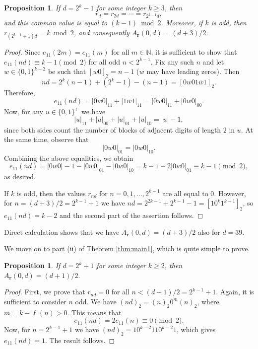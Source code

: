 \documentclass[a4paper,11pt]{amsart}
\newtheorem{prop}[thm]{Proposition}
\theoremstyle{definition}
\newcommand{\N}{\mathbb{N}}
\begin{document}
\begin{prop} \label{prop:special_case_1}
If $d = 2^{k}-1$ for some integer $k \geq 3$, then
$$ r_d =  r_{2d} = \cdots = r_{2^{k-1} d},$$
and this common value is equal to  $(k-1) \bmod{2}$.
Moreover, if $k$ is odd, then $r_{(2^{k-1}+1) d} = k \bmod{2}$, and consequently $A_{\mathbf{r}}(0,d) = (d +3)/2$.
\end{prop} 
\begin{proof}
Since $e_{11}(2m) = e_{11}(m)$ for all $m \in \N$, it is sufficient to show that $e_{11}(nd) \equiv k-1 \pmod{2}$ for all odd $n < 2^{k-1}$. 
Fix any such $n$ and let $w \in \{0,1\}^{k-2}$ be such that $[w0]_2 = n-1$ ($w$ may have leading zeros). Then
$$nd = 2^{k}(n-1) + (2^{k}-1)-(n-1) = [0w01\overline{w}1]_2.$$
Therefore,
$$e_{11}(nd) = |0w0|_{11} + |1\overline{w}1|_{11} = |0w0|_{11} + |0w0|_{00}.$$
Now, for any $u \in \{0,1\}^+$ we have
$$|u|_{11} + |u|_{00} + |u|_{01} + |u|_{10} = |u|-1,$$
since both sides count the number of blocks of adjacent digits of length $2$ in $u$.
At the same time, observe that
$$ |0w0|_{01} = |0w0|_{10}.$$
Combining the above equalities, we obtain
$$ e_{11}(nd) = |0w0| - 1 - |0w0|_{01} - |0w0|_{10} = k - 1 - 2|0w0|_{01} \equiv k-1 \pmod{2},$$
as desired.

If $k$ is odd, then the values $r_{nd}$ for $n = 0,1,\ldots,2^{k-1}$ are all equal to $0$. However, for $n = (d + 3)/2 = 2^{k-1} + 1$ we have $nd = 2^{2k-1} + 2^{k-1} - 1 = [10^k 1^{k-1}]_2$, so $e_{11}(nd) = k-2$ and the second part of the assertion follows.
\end{proof}

Direct calculation shows that we have $A_{\mathbf{r}}(0,d) = (d+3)/2$ also for $d=39$.

We move on to part (ii) of Theorem \ref{thm:main1}, which is quite simple to prove.

\begin{prop} \label{prop:special_case_2}
If $d = 2^{k}+1$ for some integer $k \geq 2$, then $A_{\mathbf{r}}(0,d) = (d + 1)/2.$
\end{prop} 
\begin{proof}
First, we prove that $r_{nd} = 0$ for all $n < (d + 1)/2 = 2^{k-1}+1$. Again, it is sufficient to consider $n$ odd. We have $(nd)_2 = (n)_2 0^m (n)_2$, where $m = k - \ell(n) > 0$. This means that
$$  e_{11}(nd) = 2e_{11}(n) \equiv 0 \pmod{2}. $$
Now, for $n = 2^{k-1}+1$ we have $(nd)_2 = 1 0^{k-2} 1 1 0^{k-2} 1$, which gives $e_{11} (nd) = 1$. The result follows.
\end{proof}
\end{document}
